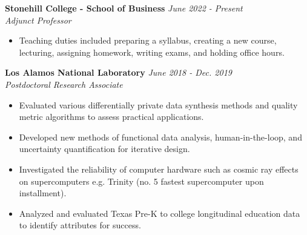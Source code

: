 \documentclass[12, letterpaper, roman]{moderncv} %
\newcommand{\workspace}{\vspace{3pt}}
\begin{document}
\workspace

\textbf{Stonehill College - School of Business} \hfill \textit{June 2022 - Present}\\
\textit{Adjunct Professor}
\begin{itemize}
    \item Teaching duties included preparing a syllabus, creating a new course, lecturing, assigning homework, writing exams, and holding office hours.
\end{itemize}

\workspace 

\textbf{Los Alamos National Laboratory} \hfill \textit{June 2018 - Dec. 2019}\\
\textit{Postdoctoral Research Associate}
\begin{itemize}
        \item Evaluated various differentially private data synthesis methods and quality metric algorithms to assess practical applications.
        \item Developed new methods of functional data analysis, human-in-the-loop, and uncertainty quantification for iterative design.
        \item Investigated the reliability of computer hardware such as cosmic ray effects on supercomputers e.g. Trinity (no. 5 fastest supercomputer upon installment).
        \item Analyzed and evaluated Texas Pre-K to college longitudinal education data to identify attributes for success.
\end{itemize}


\end{document}
